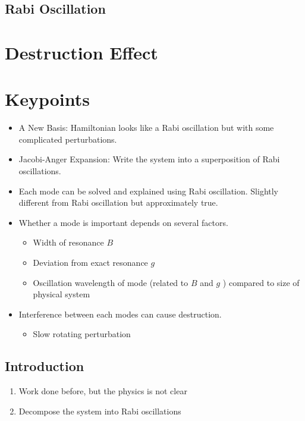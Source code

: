 \documentclass[%
preprint,
 amsmath,amssymb,
 aps,
]{revtex4-1}
\begin{document}
\subsection{Rabi Oscillation}

\section{Destruction Effect}






\appendix
\section{Keypoints}



\begin{itemize}
    \item A New Basis: Hamiltonian looks like a Rabi oscillation but with some complicated perturbations.
    \item Jacobi-Anger Expansion: Write the system into a superposition of Rabi oscillations.
    \item Each mode can be solved and explained using Rabi oscillation. Slightly different from Rabi oscillation but approximately true.
    \item Whether a mode is important depends on several factors.
        \begin{itemize}
            \item Width of resonance $B$
            \item Deviation from exact resonance $g$
            \item Oscillation wavelength of mode (related to $B$ and $g$ ) compared to size of physical system
        \end{itemize}
    \item Interference between each modes can cause destruction.
        \begin{itemize}
            \item Slow rotating perturbation
        \end{itemize}
    
\end{itemize}
    



\subsection{Introduction}


\begin{enumerate}
    \item Work done before, but the physics is not clear
    \item Decompose the system into Rabi oscillations
\end{enumerate}
\end{document}
